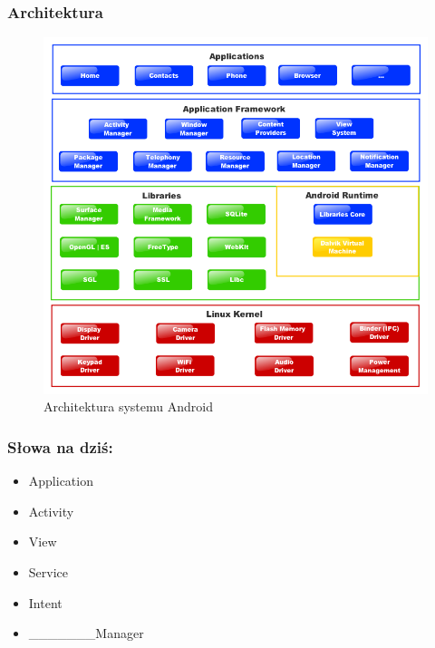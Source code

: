\documentclass{beamer}
\begin{document}
\begin{frame}\frametitle{Architektura}

  \begin{figure}[t]
    \includegraphics[height=0.62\textheight,keepaspectratio=true,clip=true]{images/platform}
    \caption{Architektura systemu Android}
  \end{figure}

\end{frame}

\begin{frame}\frametitle{Słowa na dziś:}
 \begin{itemize}
  \item \Huge{Application}
  \item \Huge{Activity}
  \item \Huge{View}
  \item \Huge{Service}
  \item \Huge{Intent}
  \item \_\_\_\_\_\_\_\Huge{Manager}
 \end{itemize}
\end{frame}
\end{document}
